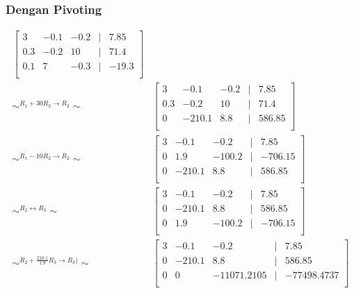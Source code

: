 \documentclass{beamer}
\begin{document}
\begin{frame}
\frametitle{Dengan Pivoting}
\begin{small}
\begin{equation}
\begin{split}
\begin{bmatrix}
	\boxed{3} & -0.1 & -0.2 & | & 7.85\\
	0.3 & -0.2 & 10 & | & 71.4\\
	0.1 & 7 & -0.3 & | & -19.3\\
	\end{bmatrix}&\\ \sim^{R_1+30R_3 \rightarrow R_3}\sim 
&\begin{bmatrix}
	3 & -0.1 & -0.2 & | & 7.85\\
	0.3 & -0.2 & 10 & | & 71.4\\
	0 & -210.1 & 8.8 & | & 586.85\\
\end{bmatrix}
\\\sim^{R_1-10R_2 \rightarrow R_2}\sim 
&\begin{bmatrix}
	3 & -0.1 & -0.2 & | & 7.85\\
	0 & 1.9 & -100.2 & | & -706.15\\
	0 & \boxed{-210.1} & 8.8 & | & 586.85\\
\end{bmatrix}
\\\sim^{R_2\leftrightarrow R_3}\sim 
&\begin{bmatrix}
	3 & -0.1 & -0.2 & | & 7.85\\
	0 & -210.1 & 8.8 & | & 586.85\\
	0 & 1.9 & -100.2 & | & -706.15\\
\end{bmatrix}
\\\sim^{R_2+\frac{210.1}{1.9}R_3 \rightarrow R_3)}\sim 
&\begin{bmatrix}
	3 & -0.1 & -0.2 & | & 7.85\\
	0 & -210.1 & 8.8 & | & 586.85\\
	0 & 0 & -11071.2105 & | & -77498.4737\\
\end{bmatrix}
\end{split}
\nonumber
\end{equation}
\end{small}
\end{frame}
\end{document}
